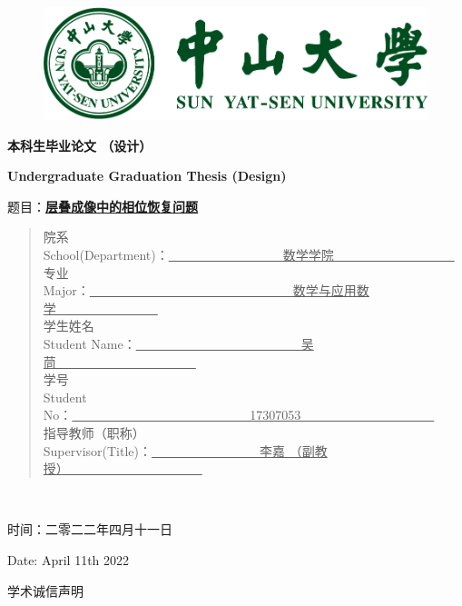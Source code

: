 \documentclass[12pt]{article}
\begin{document}
	\thispagestyle{empty}
	\begin{figure}[ht]
		\centering
		\includegraphics[scale=0.56]{SYSULogo.pdf}
	\end{figure}
	
	\begin{center}
		\textbf{{\fontsize{35pt}{0pt}本科生毕业论文 （设计）}}
		
		\Large \textbf{{\fontsize{25pt}{0pt}Undergraduate Graduation Thesis (Design)}}
	\end{center}
	
	\begin{center}
		\huge 题目：\textbf{\underline{层叠成像中的相位恢复问题}}
		
	
	\end{center}
	
	\begin{quotation}
		\large \noindent
		院系 \\
		School(Department)：\underline{~~~~~~~~~~~~~~~~~~数学学院~~~~~~~~~~~~~~~~~~~} \\
		专业 \\
		Major：\underline{~~~~~~~~~~~~~~~~~~~~~~~~~~~~~~~~数学与应用数学~~~~~~~~~~~~~~~~} \\
		学生姓名 \\
		Student Name：\underline{~~~~~~~~~~~~~~~~~~~~~~~~~~吴茼~~~~~~~~~~~~~~~~~~~~~~} \\
		学号 \\
		Student No：\underline{~~~~~~~~~~~~~~~~~~~~~~~~~~~~17307053~~~~~~~~~~~~~~~~~~~~~} \\
		指导教师（职称） \\
		Supervisor(Title)：\underline{~~~~~~~~~~~~~~~~~李嘉 （副教授）~~~~~~~~~~~~~~~~~~~~~}
	\end{quotation}
	~\\
	\begin{center}
		时间：二零二二年四月十一日
		
		Date: April 11th 2022
	\end{center}
	
	\newpage
	\thispagestyle{empty}
	\begin{center}
		\Large  学术诚信声明
	\end{center}
	
\end{document}
